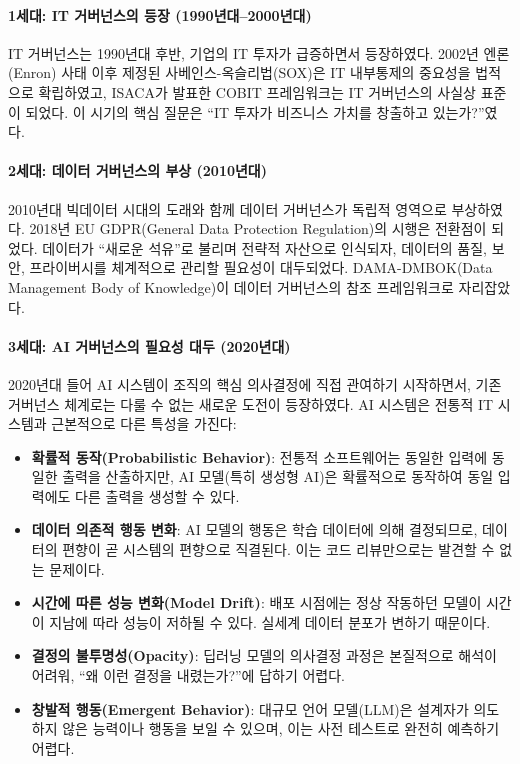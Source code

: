 \paragraph{1세대: IT 거버넌스의 등장 (1990년대--2000년대)}
IT 거버넌스는 1990년대 후반, 기업의 IT 투자가 급증하면서 등장하였다. 2002년 엔론(Enron) 사태 이후 제정된 사베인스-옥슬리법(SOX)은 IT 내부통제의 중요성을 법적으로 확립하였고, ISACA가 발표한 COBIT 프레임워크는 IT 거버넌스의 사실상 표준이 되었다. 이 시기의 핵심 질문은 ``IT 투자가 비즈니스 가치를 창출하고 있는가?''였다.

\paragraph{2세대: 데이터 거버넌스의 부상 (2010년대)}
2010년대 빅데이터 시대의 도래와 함께 데이터 거버넌스가 독립적 영역으로 부상하였다. 2018년 EU GDPR(General Data Protection Regulation)의 시행은 전환점이 되었다. 데이터가 ``새로운 석유''로 불리며 전략적 자산으로 인식되자, 데이터의 품질, 보안, 프라이버시를 체계적으로 관리할 필요성이 대두되었다. DAMA-DMBOK(Data Management Body of Knowledge)이 데이터 거버넌스의 참조 프레임워크로 자리잡았다.

\paragraph{3세대: AI 거버넌스의 필요성 대두 (2020년대)}
2020년대 들어 AI 시스템이 조직의 핵심 의사결정에 직접 관여하기 시작하면서, 기존 거버넌스 체계로는 다룰 수 없는 새로운 도전이 등장하였다.\cite{whittaker2018ai} AI 시스템은 전통적 IT 시스템과 근본적으로 다른 특성을 가진다:

\begin{itemize}
    \item \textbf{확률적 동작(Probabilistic Behavior)}: 전통적 소프트웨어는 동일한 입력에 동일한 출력을 산출하지만, AI 모델(특히 생성형 AI)은 확률적으로 동작하여 동일 입력에도 다른 출력을 생성할 수 있다.
    \item \textbf{데이터 의존적 행동 변화}: AI 모델의 행동은 학습 데이터에 의해 결정되므로, 데이터의 편향이 곧 시스템의 편향으로 직결된다. 이는 코드 리뷰만으로는 발견할 수 없는 문제이다.
    \item \textbf{시간에 따른 성능 변화(Model Drift)}: 배포 시점에는 정상 작동하던 모델이 시간이 지남에 따라 성능이 저하될 수 있다. 실세계 데이터 분포가 변하기 때문이다.
    \item \textbf{결정의 불투명성(Opacity)}: 딥러닝 모델의 의사결정 과정은 본질적으로 해석이 어려워, ``왜 이런 결정을 내렸는가?''에 답하기 어렵다.
    \item \textbf{창발적 행동(Emergent Behavior)}: 대규모 언어 모델(LLM)은 설계자가 의도하지 않은 능력이나 행동을 보일 수 있으며, 이는 사전 테스트로 완전히 예측하기 어렵다.
\end{itemize}

